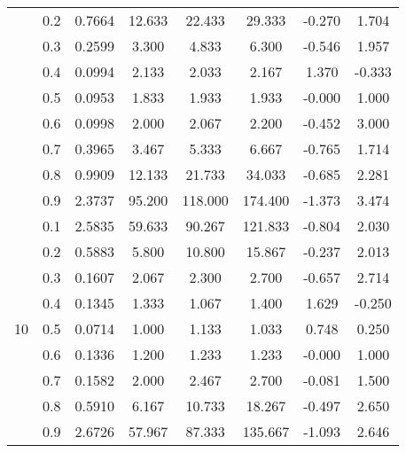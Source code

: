 \documentclass[11pt,a4paper]{report}
\begin{document}
\begin{longtable}{ | c | c || c | c | c | c | c | c | }
 & 0.2 & 0.7664 & 12.633 & 22.433 & 29.333 & -0.270 & 1.704 \\
 & 0.3 & 0.2599 & 3.300 & 4.833 & 6.300 & -0.546 & 1.957 \\
 & 0.4 & 0.0994 & 2.133 & 2.033 & 2.167 & 1.370 & -0.333 \\
 & 0.5 & 0.0953 & 1.833 & 1.933 & 1.933 & -0.000 & 1.000 \\
 & 0.6 & 0.0998 & 2.000 & 2.067 & 2.200 & -0.452 & 3.000 \\
 & 0.7 & 0.3965 & 3.467 & 5.333 & 6.667 & -0.765 & 1.714 \\
 & 0.8 & 0.9909 & 12.133 & 21.733 & 34.033 & -0.685 & 2.281 \\
 & 0.9 & 2.3737 & 95.200 & 118.000 & 174.400 & -1.373 & 3.474 \\
 \hline
\multirow{9}{*}{10} & 0.1 & 2.5835 & 59.633 & 90.267 & 121.833 & -0.804 & 2.030 \\
 & 0.2 & 0.5883 & 5.800 & 10.800 & 15.867 & -0.237 & 2.013 \\
 & 0.3 & 0.1607 & 2.067 & 2.300 & 2.700 & -0.657 & 2.714 \\
 & 0.4 & 0.1345 & 1.333 & 1.067 & 1.400 & 1.629 & -0.250 \\
 & 0.5 & 0.0714 & 1.000 & 1.133 & 1.033 & 0.748 & 0.250 \\
 & 0.6 & 0.1336 & 1.200 & 1.233 & 1.233 & -0.000 & 1.000 \\
 & 0.7 & 0.1582 & 2.000 & 2.467 & 2.700 & -0.081 & 1.500 \\
 & 0.8 & 0.5910 & 6.167 & 10.733 & 18.267 & -0.497 & 2.650 \\
 & 0.9 & 2.6726 & 57.967 & 87.333 & 135.667 & -1.093 & 2.646 \\
 \hline
\hline
\end{longtable}
\end{document}
